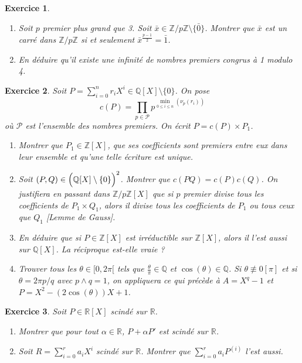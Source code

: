 \documentclass[12pt]{article}
\newtheorem{exercise}{Exercice}[section]
\theoremstyle{remark}
\theoremstyle{remark}
\newcommand{\R}{\mathbb{R}}
\newcommand{\Q}{\mathbb{Q}}
\newcommand{\Z}{\mathbb{Z}}
\begin{document}
\begin{exercise}
	\phantom{}
	\begin{enumerate}
		\item Soit $p$ premier plus grand que 3. Soit
		$\bar{x}\in\Z/p\Z\setminus\{\bar{0}\}$. Montrer que $\bar{x}$ est un carré
		dans $\Z/p\Z$ si et seulement $\bar{x}^{\frac{p-1}{2}}=\bar{1}$.
		\item En déduire qu'il existe une infinité de nombres premiers congrus à
		1 modulo 4.
	\end{enumerate}
\end{exercise}

\begin{exercise}
	Soit $P=\sum_{i=0}^{n}r_{i}X^{i}\in\Q[X]\setminus\{0\}$. On pose
	$$c(P)=\prod_{p\in\mathcal{P}}p^{\min\limits_{0\leqslant i\leqslant
	n}(\nu_{p}(r_{i}))}$$
	où $\mathcal{P}$ est l'ensemble des nombres premiers. On écrit $P=c(P)\times
	P_{1}$.
	\begin{enumerate}
		\item Montrer que $P_{1}\in\Z[X]$, que ses coefficients sont premiers
		entre eux dans leur ensemble et qu'une telle écriture est unique.
		\item Soit $(P,Q)\in
		\Bigl(\Q[X]\setminus\{0\}\Bigr)^{2}$. Montrer que $c(PQ)=c(P)c(Q)$. On
		justifiera en passant dans $\Z/p\Z[X]$ que si $p$ premier divise tous
		les coefficients de $P_{1}\times Q_{1}$, alors il divise tous les
		coefficients de $P_{1}$ ou tous ceux que $Q_{1}$ [Lemme de Gauss].
		\item En déduire que si $P\in\Z[X]$ est irréductible sur $\Z[X]$, alors
		il l'est aussi sur $\Q[X]$. La réciproque est-elle vraie ?
		\item Trouver tous les $\theta\in[0,2\pi[$ tels que
		$\frac{\theta}{\pi}\in\Q$ et $\cos(\theta)\in\Q$. Si
		$\theta\not\equiv0[\pi]$ et si $\theta=2\pi p/q$ avec $p\wedge q=1$, on
		appliquera ce qui précède à $A=X^{q}-1$ et $P=X^{2}-(2\cos(\theta))X+1$.
	\end{enumerate}
\end{exercise}

\begin{exercise}
	Soit $P\in\R[X]$ scindé sur $\R$.
	\begin{enumerate}
		\item Montrer que pour tout $\alpha\in\R$, $P+\alpha P'$ est scindé sur $\R$.
		\item Soit $R=\sum_{i=0}^{r}a_{i}X^{i}$ scindé sur $\R$. Montrer que
		$\sum_{i=0}^{r}a_{i}P^{(i)}$ l'est aussi.
	\end{enumerate}
\end{exercise}
\end{document}
